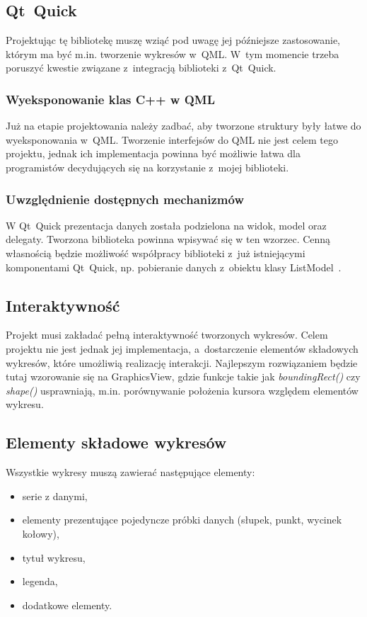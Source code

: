 \documentclass[11pt,twoside,a4paper,final]{article}
\begin{document}
\subsection{Qt~Quick}
Projektując tę bibliotekę muszę wziąć pod uwagę jej późniejsze zastosowanie, którym ma być m.in. tworzenie wykresów w~QML. W~tym momencie trzeba poruszyć kwestie związane z~integracją biblioteki z~Qt~Quick.
\subsubsection{Wyeksponowanie klas C++ w QML}
Już na etapie projektowania należy zadbać, aby tworzone struktury były łatwe do wyeksponowania w~QML. 
Tworzenie interfejsów do QML nie jest celem tego projektu, jednak ich implementacja powinna być możliwie łatwa dla programistów decydujących się na korzystanie z~mojej biblioteki.

\subsubsection{Uwzględnienie dostępnych mechanizmów}
W Qt~Quick prezentacja danych została podzielona na widok, model oraz delegaty. Tworzona biblioteka powinna wpisywać się w ten wzorzec. Cenną własnością będzie możliwość współpracy biblioteki z~już istniejącymi komponentami Qt~Quick, np. pobieranie danych z~obiektu klasy ListModel~\cite{list-model}. 

\subsection{Interaktywność}
Projekt musi zakładać pełną interaktywność tworzonych wykresów. Celem projektu nie jest jednak jej implementacja, a~dostarczenie elementów składowych wykresów, które umożliwią realizację interakcji. Najlepszym rozwiązaniem będzie tutaj wzorowanie się na GraphicsView, gdzie funkcje takie jak \textit{boundingRect()} czy \textit{shape()} usprawniają, m.in. porównywanie położenia kursora względem elementów wykresu.


\subsection{Elementy składowe wykresów}
Wszystkie wykresy muszą zawierać następujące elementy:
\begin{itemize}
\item{serie z danymi,}
\item{elementy prezentujące pojedyncze próbki danych (słupek, punkt, wycinek kołowy),}
\item{tytuł wykresu,}
\item{legenda,}
\item{dodatkowe elementy.}
\end{itemize}
\end{document}
